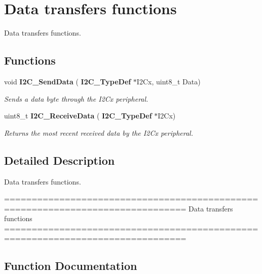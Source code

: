 \section{Data transfers functions}
\label{group__I2C__Group2}


Data transfers functions.  


\subsection*{Functions}
\begin{DoxyCompactItemize}
\item 
void \textbf{ I2\+C\+\_\+\+Send\+Data} (\textbf{ I2\+C\+\_\+\+Type\+Def} $\ast$I2\+Cx, uint8\+\_\+t Data)
\begin{DoxyCompactList}\small\item\em Sends a data byte through the I2\+Cx peripheral. \end{DoxyCompactList}\item 
uint8\+\_\+t \textbf{ I2\+C\+\_\+\+Receive\+Data} (\textbf{ I2\+C\+\_\+\+Type\+Def} $\ast$I2\+Cx)
\begin{DoxyCompactList}\small\item\em Returns the most recent received data by the I2\+Cx peripheral. \end{DoxyCompactList}\end{DoxyCompactItemize}


\subsection{Detailed Description}
Data transfers functions. 

\begin{DoxyVerb} ===============================================================================
                        Data transfers functions
 ===============================================================================  \end{DoxyVerb}
 

\subsection{Function Documentation}
\mbox{\label{group__I2C__Group2_gaeaaa4b6f77f50eb57465148c55d27fb2}} 
